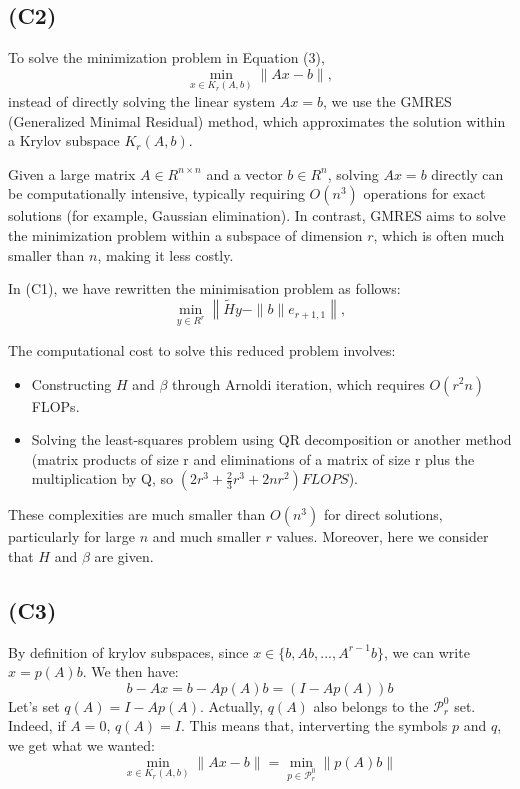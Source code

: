 \documentclass{article}
\begin{document}
\subsection*{(C2)}

To solve the minimization problem in Equation (3),
\[
\min_{x \in K_r(A, b)} \|Ax - b\|,
\]
instead of directly solving the linear system $ Ax = b $, we use the GMRES (Generalized Minimal Residual) method, which approximates the solution within a Krylov subspace $ K_r(A, b) $. 

Given a large matrix $ A \in R^{n \times n} $ and a vector $ b \in R^n $, solving $ Ax = b $ directly can be computationally intensive, 
typically requiring $ O(n^3) $ operations for exact solutions (for example, Gaussian elimination). In contrast, GMRES aims to solve the minimization problem within a subspace 
of dimension $ r $, which is often much smaller than $ n $, making it less costly.

In (C1), we have rewritten the minimisation problem as follows: 
\[
\min_{y \in R^r} \left\| \tilde{H} y - \|b\| e_{r+1,1} \right\|,
\]



The computational cost to solve this reduced problem involves:
\begin{itemize}
    \item Constructing $ H $ and $ \beta $ through Arnoldi iteration, which requires $ O(r^2 n) $ FLOPs.
    \item Solving the least-squares problem using QR decomposition or another method (matrix products of size r and eliminations of a matrix of size r plus the multiplication by Q, so $(2r^3 + \frac{2}{3}r^3 + 2nr^2)FLOPS$).
\end{itemize}
These complexities are much smaller than $ O(n^3) $ for direct solutions, particularly for large $ n $ and much smaller $ r $ values. Moreover, 
here we consider that $H$ and $\beta$ are given. 

\subsection*{(C3)}
By definition of krylov subspaces, since $x \in \{b, Ab, ..., A^{r-1}b\}$, 
we can write $x=p(A)b$. We then have:
\[
b -Ax = b - A p(A)b = (I-A p(A))b 
\]
Let's set $q(A) = I-A p(A)$. Actually, $q(A)$ also belongs to the
 $\mathcal{P}_r^0$ set. Indeed, if $A = 0$, $q(A) = I$. This means that, interverting the symbols $p$ and $q$, 
 we get what we wanted: 
 \[
\min_{x \in K_r(A, b)} \|Ax - b\|  = \min_{p \in \mathcal{P}_r^0} \|p(A)b\|
 \]
\end{document}
